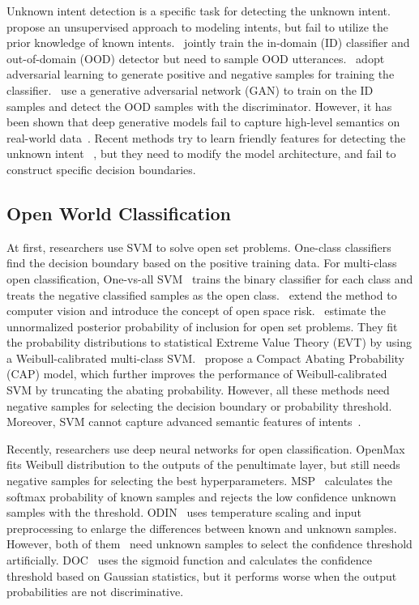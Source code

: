 \documentclass[letterpaper]{article} %
\begin{document}
Unknown intent detection is a specific task for detecting the unknown intent.~\citet{Brychcin2017UnsupervisedDA} propose an unsupervised approach to modeling intents,  but fail to utilize the prior knowledge of known intents.~\citet{Kim2018JointLO} jointly train the in-domain (ID) classifier and out-of-domain (OOD) detector but need to sample OOD utterances.~\citet{Yu2017OpenCategoryCB} adopt adversarial learning to generate positive and negative samples for training the classifier.~\citet{ryu-etal-2018-domain} use a generative adversarial network (GAN) to train on the ID samples and detect the OOD samples with the discriminator. However, it has been shown that deep generative models fail to capture high-level semantics on real-world data~\cite{2018arXiv181009136N,Mundt_2019_ICCV}. Recent methods try to learn friendly features for detecting the unknown intent ~\cite{lin-xu-2019-deep,gangal2020likelihood,yan-etal-2020-unknown}, but they need to modify the  model architecture, and fail to construct specific decision boundaries.

\subsection{Open World Classification}
At first, researchers use SVM to solve open set problems. One-class classifiers~\cite{scholkopf2001estimating,SVDD} find the decision boundary based on the positive training data. For multi-class open classification, One-vs-all SVM~\cite{Rifkin2004In} trains the binary classifier for each class and treats the negative classified samples as the open class.~\citet{scheirer2013toward} extend the method to computer vision and introduce the concept of open space risk.~\citet{Jain_2014_ECCV} estimate the unnormalized posterior probability of inclusion for open set problems. They fit the probability distributions to statistical Extreme Value Theory (EVT) by using a Weibull-calibrated multi-class SVM.~\citet{Scheirer_2014_TPAMIb} propose a Compact Abating Probability (CAP) model, which further improves the performance of Weibull-calibrated SVM by truncating the abating probability. However, all these methods need negative samples for selecting the decision boundary or probability threshold. Moreover, SVM cannot capture  advanced semantic features of intents~\cite{lin2019post}.

Recently, researchers use deep neural networks for open classification. OpenMax~\cite{bendale2016towards} fits Weibull distribution to the outputs of the penultimate layer, but still needs negative samples for selecting the best hyperparameters. MSP~\cite{hendrycks17baseline} calculates the softmax probability of known samples and rejects the low confidence unknown samples with the threshold. ODIN~\cite{liang2018enhancing} uses temperature scaling and input preprocessing to enlarge the differences between known and unknown samples. However, both of them~\cite{hendrycks17baseline,liang2018enhancing} need unknown samples to select the confidence threshold  artificially. DOC~\cite{Shu2017DOCDO} uses the sigmoid function and calculates the confidence threshold based on Gaussian statistics, but it performs worse when the output probabilities are not discriminative.
\end{document}
